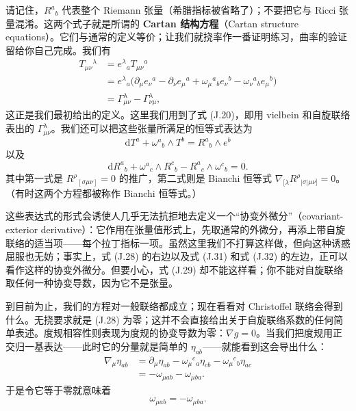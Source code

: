 请记住，$R^{a}{}_{b}$ 代表整个 Riemann 张量（希腊指标被省略了）；不要把它与 Ricci 张量混淆。这两个式子就是所谓的 \textbf{Cartan 结构方程}（Cartan structure equations）。它们与通常的定义等价；让我们就挠率作一番证明练习，曲率的验证留给你自己完成。我们有
\begin{align*}
T_{\mu\nu}{}^{\lambda} &= e^{\lambda}{}_{a}T_{\mu\nu}{}^{a} \\
&= e^{\lambda}{}_{a}\big(\partial_{\mu}e_{\nu}{}^{a} - \partial_{\nu}e_{\mu}{}^{a} + \omega_{\mu}{}^{a}{}_{b}e_{\nu}{}^{b} - \omega_{\nu}{}^{a}{}_{b}e_{\mu}{}^{b}\big) \\
&= \Gamma^{\lambda}_{\mu\nu} - \Gamma^{\lambda}_{\nu\mu}, \tag{J.30}
\end{align*}
这正是我们最初给出的定义。这里我们用到了式 (J.20)，即用 vielbein 和自旋联络表出的 $\Gamma^{\lambda}_{\mu\nu}$。我们还可以把这些张量所满足的恒等式表达为
\begin{equation*}
\mathrm{d}T^{a} + \omega^{a}{}_{b}\wedge T^{b} = R^{a}{}_{b}\wedge e^{b}
\tag{J.31}
\end{equation*}
以及
\begin{equation*}
\mathrm{d}R^{a}{}_{b} + \omega^{a}{}_{c}\wedge R^{c}{}_{b} - R^{a}{}_{c}\wedge\omega^{c}{}_{b} = 0.
\tag{J.32}
\end{equation*}
其中第一式是 $R^{\rho}{}_{[\sigma\mu\nu]} = 0$ 的推广，第二式则是 Bianchi 恒等式 $\nabla_{[\lambda}R^{\rho}{}_{|\sigma|\mu\nu]} = 0$。（有时这两个方程都被称作 Bianchi 恒等式。）

这些表达式的形式会诱使人几乎无法抗拒地去定义一个“协变外微分”（covariant-exterior derivative）：它作用在张量值形式上，先取通常的外微分，再添上带自旋联络的适当项——每个拉丁指标一项。虽然这里我们不打算这样做，但向这种诱惑屈服也无妨；事实上，式 (J.28) 的右边以及式 (J.31) 和式 (J.32) 的左边，正可以看作这样的协变外微分。但要小心，式 (J.29) 却不能这样看；你不能对自旋联络取任何一种协变导数，因为它不是张量。

到目前为止，我们的方程对一般联络都成立；现在看看对 Christoffel 联络会得到什么。无挠要求就是 (J.28) 为零；这并不会直接给出关于自旋联络系数的任何简单表述。度规相容性则表现为度规的协变导数为零：$\nabla g = 0$。当我们把度规用正交归一基表达——此时它的分量就是简单的 $\eta_{ab}$——就能看到这会导出什么：
\begin{align*}
\nabla_{\mu}\eta_{ab} &= \partial_{\mu}\eta_{ab} - \omega_{\mu}{}^{c}{}_{a}\eta_{cb} - \omega_{\mu}{}^{c}{}_{b}\eta_{ac} \\
&= -\omega_{\mu ab} - \omega_{\mu ba}. \tag{J.33}
\end{align*}
于是令它等于零就意味着
\begin{equation*}
\omega_{\mu ab} = -\omega_{\mu ba}.
\tag{J.34}
\end{equation*}


